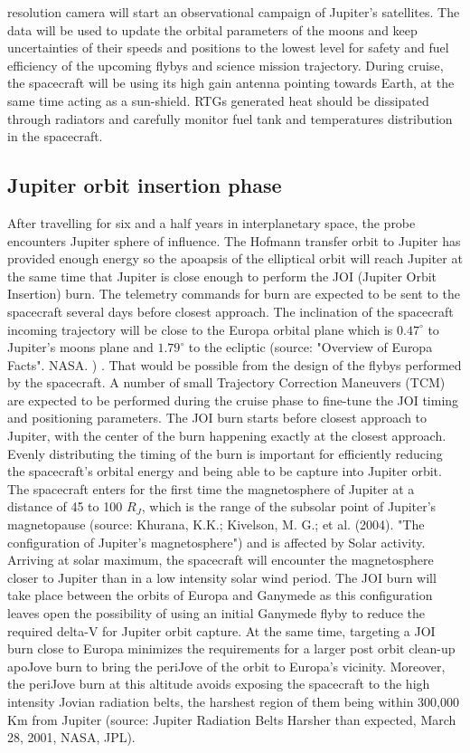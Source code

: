 resolution camera will start an observational campaign of Jupiter’s satellites. The data will be used to update the orbital parameters of the moons and keep uncertainties of their speeds and positions to the lowest level for safety and fuel efficiency of the upcoming flybys and science mission trajectory. During cruise, the spacecraft will be using its high gain antenna pointing towards Earth, at the same time acting as a sun-shield. RTGs generated heat should be dissipated through radiators and carefully monitor fuel tank and temperatures distribution in the spacecraft.
\subsection{Jupiter orbit insertion phase}
After travelling for six and a half years in interplanetary space, the probe encounters Jupiter sphere of influence. The Hofmann transfer orbit to Jupiter has provided enough energy so the apoapsis of the elliptical orbit will reach Jupiter at the same time that Jupiter is close enough to perform the JOI (Jupiter Orbit Insertion) burn. The telemetry commands for burn are expected to be sent to the spacecraft several days before closest approach. The inclination of the spacecraft incoming trajectory will be close to the Europa orbital plane which is $0.47^\circ$ to Jupiter’s moons plane and $1.79^\circ$ to the ecliptic (source: "Overview of Europa Facts". NASA. )
. That would be possible from the design of the flybys performed by the spacecraft. A number of small Trajectory Correction Maneuvers (TCM) are expected to be performed during the cruise phase to fine-tune the JOI timing and positioning parameters. The JOI burn starts before closest approach to Jupiter, with the center of the burn happening exactly at the closest approach. Evenly distributing the timing of the burn is important for efficiently reducing the spacecraft’s orbital energy and being able to be capture into Jupiter orbit. The spacecraft enters for the first time the magnetosphere of Jupiter at a distance of 45 to 100 $R_J$, which is the range of the subsolar point of Jupiter’s magnetopause (source: Khurana, K.K.; Kivelson, M. G.; et al. (2004).
"The configuration of Jupiter's magnetosphere") and is affected by Solar activity. Arriving at solar maximum, the spacecraft will encounter the magnetosphere closer to Jupiter than in a low intensity solar wind period. The JOI burn will take place between the orbits of Europa and Ganymede as this configuration leaves open the possibility of using an initial Ganymede flyby to reduce the required delta-V for Jupiter orbit capture. At the same time, targeting a JOI burn close to Europa minimizes the requirements for a larger post orbit clean-up apoJove burn to bring the periJove of the orbit to Europa’s vicinity. Moreover, the periJove burn at this altitude avoids exposing the spacecraft to the high intensity Jovian radiation belts, the harshest region of them being within 300,000 Km from Jupiter (source: Jupiter Radiation Belts Harsher than expected, March 28, 2001, NASA, JPL).
